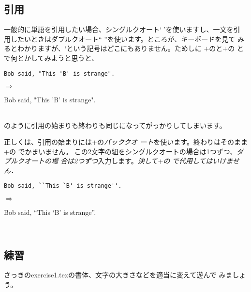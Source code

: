 \subsection{引用}
一般的に単語を引用したい場合、シングルクオート` 'を使いますし、一文を引
用したいときはダブルクオート`` ''を使います。ところが、キーボードを見て
みるとわかりますが、`という記号はどこにもありません。ためしに
$+$のと$+$の
とで何とかしてみようと思うと、\\
\begin{minipage}[c]{.50\textwidth}
\begin{screen}
\small
\begin{verbatim}
Bob said, "This 'B' is strange".
\end{verbatim}
\end{screen}
\end{minipage}%
$\Rightarrow$
\begin{minipage}{.45\textwidth}
\begin{shadebox}
Bob said, "This 'B' is strange".
\end{shadebox}
\end{minipage}
\vspace*{1mm}\\
のように引用の始まりも終わりも同じになってがっかりしてしまいます。

正しくは、引用の始まりには$+$の\emph{バッククオ
ート}を使います。終わりはそのまま$+$の
でかまいません。
この2文字の組をシングルクオートの場合は1つずつ、\emph{ダブルクオートの場
合は2つずつ}入力します。\emph{決して}$+$\emph{の}
\emph{で代用してはいけません．}\\

\begin{minipage}[c]{.50\textwidth}
\begin{screen}
\small
\begin{verbatim}
Bob said, ``This `B' is strange''.
\end{verbatim}
\end{screen}
\end{minipage}%
$\Rightarrow$
\begin{minipage}{.45\textwidth}
\begin{shadebox}
Bob said, ``This `B' is strange''.
\end{shadebox}
\end{minipage}
\vspace*{1mm}\\

\subsection{練習}
さっきのexercise1.texの書体、文字の大きさなどを適当に変えて遊んで
みましょう。

\pagebreak

